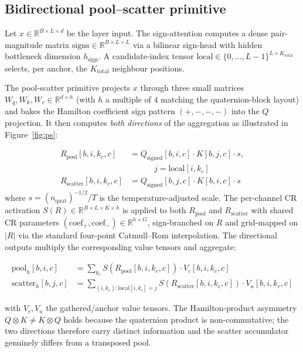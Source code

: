 \documentclass[11pt, a4paper]{article}
\begin{document}
\subsection{Bidirectional pool--scatter primitive}
\label{sec:ps}

Let $x \in \mathbb{R}^{B \times L \times d}$ be the layer input. The
sign-attention computes a dense pair-magnitude matrix
$\mathrm{signs} \in \mathbb{R}^{B \times L \times L}$ via a bilinear
sign-head with hidden bottleneck dimension $h_{\text{sign}}$. A
candidate-index tensor
$\mathrm{local} \in \{0, \ldots, L-1\}^{L \times K_{\text{total}}}$
selects, per anchor, the $K_{\text{total}}$ neighbour positions.

The pool-scatter primitive projects $x$ through three small matrices
$W_q, W_k, W_v \in \mathbb{R}^{d \times h}$ (with $h$ a multiple of $4$
matching the quaternion-block layout) and bakes the Hamilton
coefficient sign pattern $(+,-,-,-)$ into the $Q$ projection. It then
computes \emph{both directions} of the aggregation as illustrated in
Figure~\ref{fig:ps}:

\begin{align}
R_{\text{pool}}[b, i, k_c, c]
  &= Q_{\text{signed}}[b, i, c] \cdot K[b, j, c] \cdot s, \nonumber \\
& \qquad \quad j = \mathrm{local}[i, k_c] \\
R_{\text{scatter}}[b, i, k_c, c]
  &= Q_{\text{signed}}[b, j, c] \cdot K[b, i, c] \cdot s
\end{align}
where $s = (n_{\text{quat}})^{-1/2} / T$ is the temperature-adjusted
scale. The per-channel CR activation
$S(R) \in \mathbb{R}^{B \times L \times K \times h}$ is applied to both
$R_{\text{pool}}$ and $R_{\text{scatter}}$ with shared CR parameters
$(\mathrm{coef}_+, \mathrm{coef}_-) \in \mathbb{R}^{h \times G}$,
sign-branched on $R$ and grid-mapped on $|R|$ via the standard
four-point Catmull--Rom interpolation. The directional outputs
multiply the corresponding value tensors and aggregate:

\begin{align}
\mathrm{pool}_h[b, i, c]
  &= \sum_{k_c} S(R_{\text{pool}}[b,i,k_c,c]) \cdot V_c[b,i,k_c,c]\\
\mathrm{scatter}_h[b, j, c]
  &= \sum_{(i, k_c) : \mathrm{local}[i,k_c] = j}
     S(R_{\text{scatter}}[b,i,k_c,c]) \cdot V_a[b,i,k_c,c]
\end{align}

with $V_c, V_a$ the gathered/anchor value tensors. The
Hamilton-product asymmetry $Q \otimes K \ne K \otimes Q$ holds
because the quaternion product is non-commutative; the two directions
therefore carry distinct information and the scatter accumulator
genuinely differs from a transposed pool.
\end{document}
